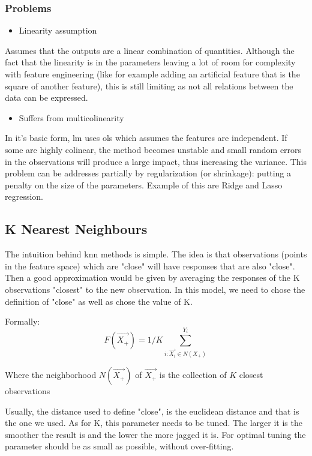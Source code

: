 \subsubsection{Problems}
\begin{itemize}
\item Linearity assumption
\end{itemize}
Assumes that the outputs are a linear combination of quantities. Although the fact that the linearity is in the parameters leaving a lot of room for complexity with feature engineering (like for example adding an artificial feature that is the square of another feature), this is still limiting as not all relations between the data can be expressed.
\begin{itemize}
\item Suffers from multicolinearity 
\end{itemize}
In it's basic form, \acrlong{lm} uses \acrfull{ols} which assumes the features are independent. If some are highly colinear, the method becomes unstable and small random errors in the observations will produce a large impact, thus increasing the variance. This problem can be addresses partially by regularization (or shrinkage): putting a penalty on the size of the parameters. Example of this are Ridge and Lasso regression.

\subsection{K Nearest Neighbours}
The intuition behind \acrfull{knn} methods is simple. The idea is that observations (points in the feature space) which are "close" will have responses that are also "close". Then a good approximation would be given by averaging the responses of the K observations "closest" to the new observation.
In this model, we need to chose the definition of "close" as well as chose the value of K.

Formally:
 $$
 F(\vec{X_+}) = 1/K \sum_{i:\vec{X_i} \in N(X_+)}^{Y_i}
 $$

Where the neighborhood $N(\vec{X_+})$ of $ \vec{X_+} $ is the collection of $K$ closest observations

Usually, the distance used to define "close", is the euclidean distance and that is the one we used. As for K, this parameter needs to be tuned. The larger it is the smoother the result is and the lower the more jagged it is. For optimal tuning the parameter should be as small as possible, without over-fitting.
